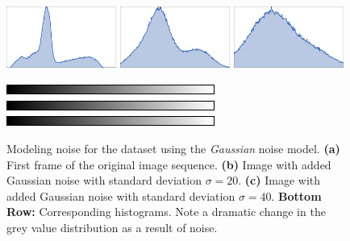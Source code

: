  


\begin{figure}[!ht]
  \centerline{
    \mbox{}
    \mbox{}
    \mbox{}
  }
  \vspace{3pt}
   \centerline{
    \mbox{\includegraphics[width=0.3215\textwidth]{figures/hyd1_n00_hist.pdf}}
    \mbox{\includegraphics[width=0.3215\textwidth]{figures/hyd1_n20_hist.pdf}}
    \mbox{\includegraphics[width=0.3215\textwidth]{figures/hyd1_n40_hist.pdf}}
  }
  
  \centerline{
     	\mbox{\includegraphics[scale=0.565]{figures/hist.png}}
     	\mbox{\includegraphics[scale=0.565]{figures/hist.png}}
     	\mbox{\includegraphics[scale=0.565]{figures/hist.png}}
  }
  \caption[Modeling noisy datasets]{Modeling noise for the \hyd dataset using the \textit{Gaussian} noise model. \textbf{(a)} First frame of the original image sequence. \textbf{(b)} Image with added Gaussian noise with standard deviation $\sigma = 20$. \textbf{(c)} Image with added Gaussian noise with standard deviation $\sigma = 40$. \textbf{Bottom Row:} Corresponding histograms. Note a dramatic change in the grey value distribution as a result of noise.}
  \label{fig:noisy}
\end{figure}





